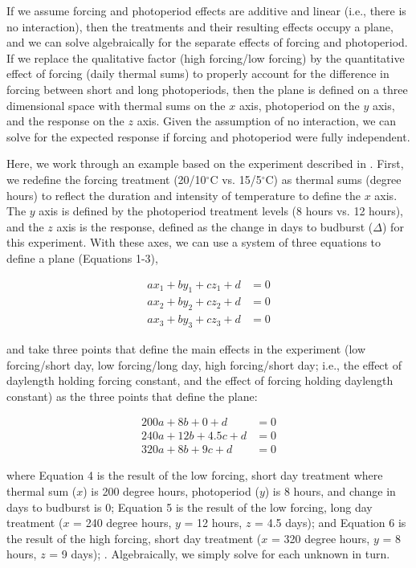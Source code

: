 \documentclass[11pt]{article}
\begin{document}
If we assume forcing and photoperiod effects are additive and linear (i.e., there is no interaction), then the treatments and their resulting effects occupy a plane, and we can solve algebraically for the separate effects of forcing and photoperiod.  If we replace the qualitative factor (high forcing/low forcing) by the quantitative effect of forcing (daily thermal sums) to properly account for the difference in forcing between short and long photoperiods, then the plane is defined on a three dimensional space with thermal sums on the $x$ axis, photoperiod on the $y$ axis, and the response on the $z$ axis. Given the assumption of no interaction, we can solve for the expected response if forcing and photoperiod were fully independent. 

Here, we work through an example based on the experiment described in \cite{Flynn2018}. First, we redefine the forcing treatment (20/10$^{\circ}$C vs. 15/5$^{\circ}$C) as thermal sums (degree hours) to reflect the duration and intensity of temperature to define the $x$ axis. The $y$ axis is defined by the photoperiod treatment levels (8 hours vs. 12 hours), and the $z$ axis is the response, defined as the change in days to budburst ($\Delta$) for this experiment. With these axes, we can use a system of three equations to define a plane (Equations 1-3), 

\begin{align}
ax_1+by_1+cz_1+d & =0\\
ax_2+by_2+cz_2+d & =0\\
ax_3+by_3+cz_3+d & =0
\end{align}

and take three points that define the main effects in the experiment (low forcing/short day, low forcing/long day, high forcing/short day; i.e., the effect of daylength holding forcing constant, and the effect of forcing holding daylength constant) as the three points that define the plane:
  
  \begin{align}
200a + 8b + 0 + d &= 0\\
240a + 12b+4.5c + d &=0\\
320a + 8b + 9c+ d &=0
\end{align}

where Equation 4 is the result of the low forcing, short day treatment where thermal sum ($x$) is 200 degree hours, photoperiod ($y$) is 8 hours, and change in days to budburst is 0; Equation 5 is the result of the low forcing, long day treatment ($x$ = 240 degree hours, $y$ = 12 hours, $z$ = 4.5 days); and Equation 6 is the result of the high forcing, short day treatment ($x$ = 320 degree hours, $y$ = 8 hours, $z$ = 9 days); \citep[see][Table S5]{Flynn2018}.  Algebraically, we simply solve for each unknown in turn. 
\end{document}
